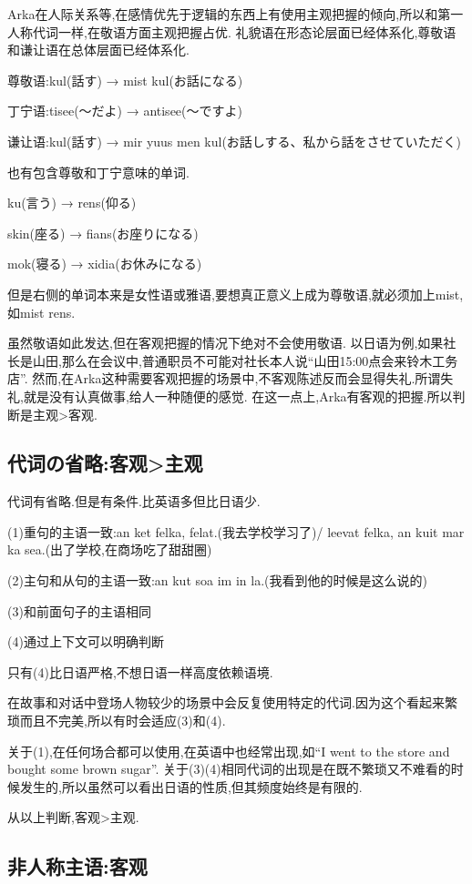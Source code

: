 Arka在人际关系等,在感情优先于逻辑的东西上有使用主观把握的倾向,所以和第一人称代词一样,在敬语方面主观把握占优.
礼貌语在形态论层面已经体系化,尊敬语和谦让语在总体层面已经体系化.
{\kaishu

尊敬语:kul(話す) → mist kul(お話になる)

丁宁语:tisee(～だよ) → antisee(～ですよ)

谦让语:kul(話す) → mir yuus men kul(お話しする、私から話をさせていただく)
}

也有包含尊敬和丁宁意味的单词.
{\kaishu

ku(言う) → rens(仰る)

skin(座る) → fians(お座りになる)

mok(寝る) → xidia(お休みになる)
}

但是右侧的单词本来是女性语或雅语,要想真正意义上成为尊敬语,就必须加上mist,如mist rens.

虽然敬语如此发达,但在客观把握的情况下绝对不会使用敬语.
以日语为例,如果社长是山田,那么在会议中,普通职员不可能对社长本人说“山田15:00点会来铃木工务店”.
然而,在Arka这种需要客观把握的场景中,不客观陈述反而会显得失礼.所谓失礼,就是没有认真做事,给人一种随便的感觉.
在这一点上,Arka有客观的把握.所以判断是主观>客观.

\subsection{代词の省略:客观>主观}

代词有省略.但是有条件.比英语多但比日语少.

(1)重句的主语一致:an ket felka, felat.(我去学校学习了)/ leevat felka, an kuit mar ka sea.(出了学校,在商场吃了甜甜圈)

(2)主句和从句的主语一致:an kut soa im in la.(我看到他的时候是这么说的)

(3)和前面句子的主语相同

(4)通过上下文可以明确判断

只有(4)比日语严格,不想日语一样高度依赖语境.

在故事和对话中登场人物较少的场景中会反复使用特定的代词.因为这个看起来繁琐而且不完美,所以有时会适应(3)和(4).

关于(1),在任何场合都可以使用,在英语中也经常出现,如“I went to the store and bought some brown sugar”.
关于(3)(4)相同代词的出现是在既不繁琐又不难看的时候发生的,所以虽然可以看出日语的性质,但其频度始终是有限的.

从以上判断,客观>主观.

\subsection{非人称主语:客观}

